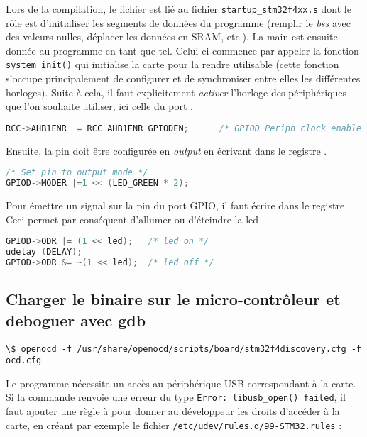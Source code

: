 \documentclass{FicheLecture}
\begin{document}
Lors de la compilation, le fichier est lié au fichier \texttt{startup\_stm32f4xx.s} dont le rôle est d'initialiser les segments de données du programme (remplir le \emph{bss} avec des valeurs nulles, déplacer les données en SRAM, etc.). La main est ensuite donnée au programme en tant que tel. Celui-ci commence par appeler la fonction \texttt{system\_init()} qui initialise la carte pour la rendre utilisable (cette fonction s'occupe principalement de configurer et de synchroniser entre elles les différentes horloges). Suite à cela, il faut explicitement \emph{activer} l'horloge des périphériques que l'on souhaite utiliser, ici celle du port . 

\begin{lstlisting}[language=C]
RCC->AHB1ENR  = RCC_AHB1ENR_GPIODEN;      /* GPIOD Periph clock enable */
\end{lstlisting}

Ensuite, la pin doit être configurée en \emph{output} en écrivant dans le registre . 

\begin{lstlisting}[language=C]
/* Set pin to output mode */
GPIOD->MODER |=1 << (LED_GREEN * 2);
\end{lstlisting}

Pour émettre un signal sur la pin du port GPIO, il faut écrire dans le registre .
Ceci permet par conséquent d'allumer ou d'éteindre la led

\begin{lstlisting}[language=C]
GPIOD->ODR |= (1 << led);   /* led on */
udelay (DELAY);
GPIOD->ODR &= ~(1 << led);  /* led off */
\end{lstlisting}

\subsection{Charger le binaire sur le micro-contrôleur et deboguer avec gdb}

\begin{lstlisting}
\$ openocd -f /usr/share/openocd/scripts/board/stm32f4discovery.cfg -f ocd.cfg
\end{lstlisting}

Le programme  nécessite un accès au périphérique USB correspondant à la carte. Si la commande renvoie une erreur du type \texttt{Error: libusb\_open() failed}, il faut ajouter une règle à  pour donner au développeur les droits d'accéder à la carte, en créant par exemple le fichier \texttt{/etc/udev/rules.d/99-STM32.rules} :
\end{document}
